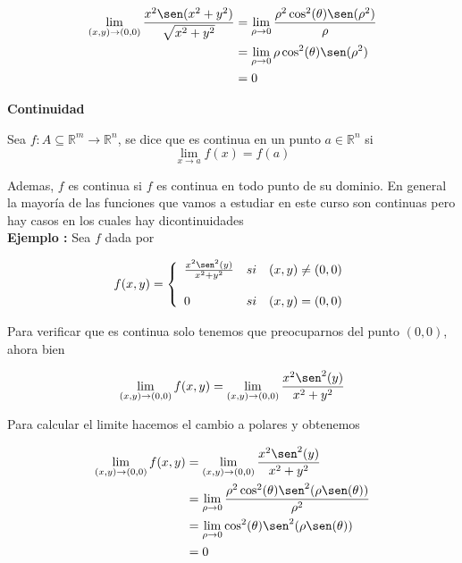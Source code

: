 \documentclass{article}
\theoremstyle{definition}
\begin{document}
\begin{align*}
\displaystyle \lim_{(x,y) \to (0,0)}   \frac{x^2\sen(x^2+y^2)}{\sqrt{x^2+y^2}}  &=  \lim_{\rho \to 0}  \frac{\rho^2 \cos^2(\theta)\sen(\rho^2)}{\rho} \\
&=  \lim_{\rho \to 0}  \rho \cos^2(\theta)\sen(\rho^2) \\
&= 0
\end{align*}


\newpage

\begin{center}
\textbf{\large{Continuidad}} \\
\end{center}

Sea $f : A \subseteq \mathbb{R}^m \to \mathbb{R}^n$, se dice que es continua en un punto $a \in \mathbb{R}^n$ si   \\


\begin{equation}
\lim_{x \to a} f(x) = f(a)
\end{equation}


Ademas, $f$ es continua si $f$ es continua en todo punto de su dominio. En general la mayor\'ia de las funciones que vamos a estudiar en este curso son continuas pero hay casos en los cuales hay dicontinuidades\ \\

\textbf{Ejemplo :} Sea $f$ dada por

\begin{align*}
f(x,y) = \left\{ \begin{array}{lcc} \frac{x^2\sen^2(y)}{x^2+y^2} & si & (x,y) \neq (0,0) \\ \\ 0 & si & (x,y) =(0,0) \end{array} \right.
\end{align*}

Para verificar que es continua solo tenemos que preocuparnos del punto $(0,0)$, ahora bien


\begin{align*}
\lim_{(x,y) \to (0,0)} f(x,y) &= \lim_{(x,y) \to (0,0)} \frac{x^2\sen^2(y)}{x^2+y^2} \\
\end{align*}


Para calcular el limite hacemos el cambio a polares y obtenemos


\begin{align*}
\lim_{(x,y) \to (0,0)} f(x,y) &= \lim_{(x,y) \to (0,0)} \frac{x^2\sen^2(y)}{x^2+y^2} \\
&= \lim_{\rho \to 0} \frac{\rho^2 \cos^2(\theta)\sen^2(\rho \sen(\theta))}{\rho^2} \\
&= \lim_{\rho \to 0} \cos^2(\theta)\sen^2(\rho \sen(\theta)) \\
&=0
\end{align*}
\end{document}
